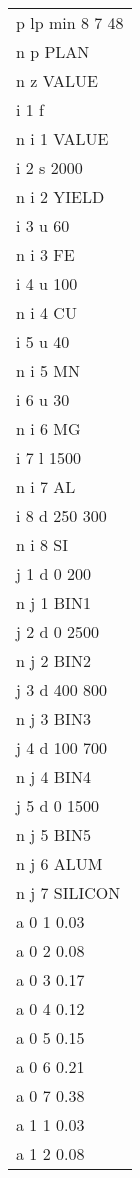 \begin{center}
\footnotesize\tt
\begin{tabular}{l@{\hspace*{50pt}}}
p lp min 8 7 48   \\
n p PLAN          \\
n z VALUE         \\
i 1 f             \\
n i 1 VALUE       \\
i 2 s 2000        \\
n i 2 YIELD       \\
i 3 u 60          \\
n i 3 FE          \\
i 4 u 100         \\
n i 4 CU          \\
i 5 u 40          \\
n i 5 MN          \\
i 6 u 30          \\
n i 6 MG          \\
i 7 l 1500        \\
n i 7 AL          \\
i 8 d 250 300     \\
n i 8 SI          \\
j 1 d 0 200       \\
n j 1 BIN1        \\
j 2 d 0 2500      \\
n j 2 BIN2        \\
j 3 d 400 800     \\
n j 3 BIN3        \\
j 4 d 100 700     \\
n j 4 BIN4        \\
j 5 d 0 1500      \\
n j 5 BIN5        \\
n j 6 ALUM        \\
n j 7 SILICON     \\
a 0 1 0.03        \\
a 0 2 0.08        \\
a 0 3 0.17        \\
a 0 4 0.12        \\
a 0 5 0.15        \\
a 0 6 0.21        \\
a 0 7 0.38        \\
a 1 1 0.03        \\
a 1 2 0.08        \\

\end{tabular}
\end{center}
